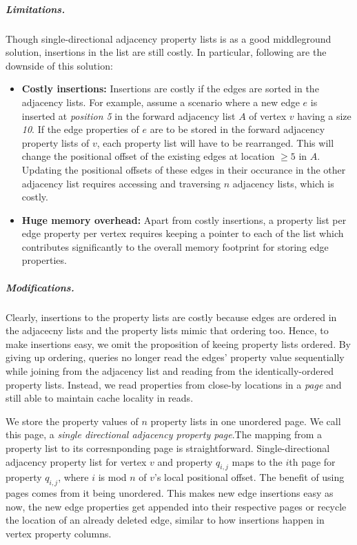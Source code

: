 \vspace{-12pt}
\subparagraph{Limitations.}Though single-directional adjacency property lists is as a good middleground solution, insertions in the list are still costly. In particular, following are the downside of this solution:
\begin{itemize}
	\item \textbf{Costly insertions:} Insertions are costly if the edges are sorted in the adjacency lists. For example, assume a scenario where a new edge $e$ is inserted at \emph{position 5} in the forward adjacency list $A$ of vertex $v$ having a size \emph{10}. If the edge properties of $e$ are to be stored in the forward adjacency property lists of $v$, each property list will have to be rearranged. This will change the positional offset of the existing edges at location $\geq5$ in $A$. Updating the positional offsets of these edges in their occurance in the other adjacency list requires accessing and traversing $n$ adjacency lists, which is costly.
	
	\item \textbf{Huge memory overhead:} Apart from costly insertions, a property list per edge property per vertex requires keeping a pointer to each of the list which contributes significantly to the overall memory footprint for storing edge properties.
\end{itemize}

\vspace{-16pt}
\subparagraph{Modifications.}Clearly, insertions to the property lists are costly because edges are ordered in the adjacecny lists and the property lists mimic that ordering too. Hence, to make insertions easy, we omit the proposition of keeing property lists ordered. By giving up ordering, queries no longer read the edges' property value sequentially while joining from the adjacency list and reading from the identically-ordered property lists. Instead, we read properties from close-by locations in a \emph{page} and still able to maintain cache locality in reads.

We store the property values of $n$ property lists in one unordered page. We call this page, a \emph{single directional adjacency property page}.The mapping from a property list to its corresnponding page is straightforward. Single-directional adjacency property list for vertex $v$ and property $q_{i,j}$ maps to the $i$th page for property $q_{i,j}$, where $i$ is mod $n$ of $v$'s local positional offset. The benefit of using pages comes from it being unordered. This makes new edge insertions easy as now, the new edge properties get appended into their respective pages or recycle the location of an already deleted edge, similar to how insertions happen in vertex property columns. 


